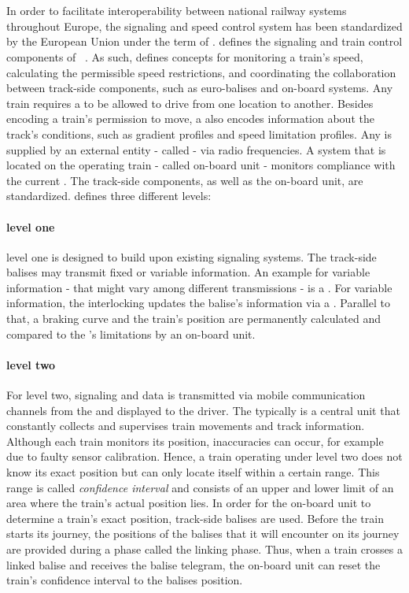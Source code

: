 \section{}
In order to facilitate interoperability between national railway systems throughout Europe, the signaling and speed control system has been standardized by the European Union under the term of .
 defines the signaling and train control components of ~\cite{ETCS26}.
As such,  defines concepts for monitoring a train's speed, calculating the permissible speed restrictions, and coordinating the collaboration between track-side components, such as  euro-balises and on-board systems.
Any train requires a  to be allowed to drive from one location to another.
Besides encoding a train's permission to move, a  also encodes information about the track's conditions, such as gradient profiles and speed limitation profiles.
Any  is supplied by an external entity - called  - via radio frequencies.
A system that is located on the operating train - called on-board unit - monitors compliance with the current .
The track-side components, as well as the on-board unit, are standardized.
 defines three different levels:

\paragraph{ level one}
 level one is designed to build upon existing signaling systems.
The track-side balises may transmit fixed or variable information.
An example for variable information - that might vary among different transmissions - is a .
For variable information, the interlocking updates the balise's information via a .
Parallel to that, a braking curve and the train's position are permanently calculated and compared to the 's limitations by an on-board unit.

\paragraph{ level two}
For  level two, signaling and  data is transmitted via mobile communication channels from the  and displayed to the driver.
The  typically is a central unit that constantly collects and supervises train movements and track information.
Although each train monitors its position, inaccuracies can occur, for example due to faulty sensor calibration.
Hence, a train operating under  level two does not know its exact position but can only locate itself within a certain range.
This range is called \textit{confidence interval} and consists of an upper and lower limit of an area where the train's actual position lies.
In order for the on-board unit to determine a train's exact position, track-side balises are used.
Before the train starts its journey, the positions of the balises that it will encounter on its journey are provided during a phase called the linking phase.
Thus, when a train crosses a linked balise and receives the balise telegram, the on-board unit can reset the train's confidence interval to the balises position.

